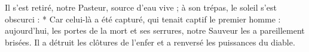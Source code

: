 Il s'est retiré, notre Pasteur, source d'eau vive ; à son trépas, le soleil s'est obscurci :
* Car celui-là a été capturé, qui tenait captif le premier homme : aujourd'hui, les portes de la mort et ses serrures, notre Sauveur les a pareillement brisées.
\versseparator
Il a détruit les clôtures de l'enfer et a renversé les puissances du diable.